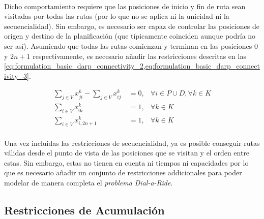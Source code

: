\documentclass{subfiles}
\begin{document}
        \paragraph{}
        Dicho comportamiento requiere que las posiciones de inicio y fin de ruta sean visitadas por todas las rutas (por lo que no se aplica ni la unicidad ni la secuencialidad). Sin embargo, es necesario ser capaz de controlar las posiciones de origen y destino de la planificación (que típicamente coinciden aunque podría no ser así). Asumiendo que todas las rutas comienzan y terminan en las posiciones $0$ y $2n + 1$ respectivamente, es necesario añadir las restricciones descritas en las \cref{eq:formulation_basic_darp_connectivity_2,eq:formulation_basic_darp_connectivity_3}.

        \begin{align}
        \label{eq:formulation_basic_darp_connectivity_1}
          \displaystyle\sum\limits_{j \in V} x_{ji}^{k} - \sum\limits_{j \in V} x_{ij}^{k} \ &= 0, & \forall i \in P \cup D, \forall k \in K \\
        \label{eq:formulation_basic_darp_connectivity_2}
          \displaystyle\sum\limits_{i \in V} x_{0i}^{k}  \ &= 1,     & \forall k \in K \\
        \label{eq:formulation_basic_darp_connectivity_3}
          \displaystyle\sum\limits_{i \in V} x_{i,2n+1}^{k}  \ &= 1, & \forall k \in K
        \end{align}

        \paragraph{}
        Una vez incluidas las restricciones de secuencialidad, ya es posible conseguir rutas válidas desde el punto de vista de las posiciones que se visitan y el orden entre estas. Sin embargo, estas no tienen en cuenta ni tiempos ni capacidades por lo que es necesario añadir un conjunto de restricciones addicionales para poder modelar de manera completa el \emph{problema Dial-a-Ride}.

      \subsection{Restricciones de Acumulación}
      \label{sec:formulation_basic_darp_accumulation}
\end{document}
